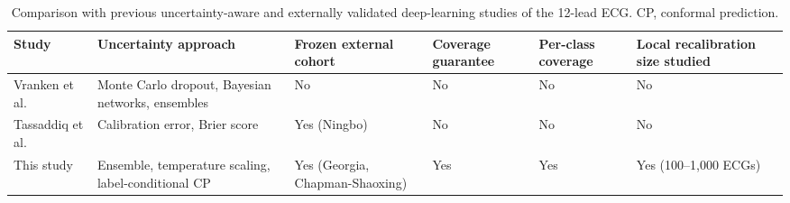 \begin{table}[!t]
\centering\footnotesize
\caption{Comparison with previous uncertainty-aware and externally validated deep-learning studies of the 12-lead ECG. CP, conformal prediction.}
\label{tab:related}
\setlength{\tabcolsep}{3pt}
\begin{tabular}{L{2.3cm}L{3.1cm}L{2.2cm}L{1.5cm}L{1.4cm}L{1.9cm}}
\toprule
Study & Uncertainty approach & Frozen external cohort & Coverage guarantee & Per-class coverage & Local recalibration size studied \\
\midrule
Vranken et al. \cite{vranken2021} & Monte Carlo dropout, Bayesian networks, ensembles & No & No & No & No \\
Tassaddiq et al. \cite{tassaddiq2026} & Calibration error, Brier score & Yes (Ningbo) & No & No & No \\
This study & Ensemble, temperature scaling, label-conditional CP & Yes (Georgia, Chapman-Shaoxing) & Yes & Yes & Yes (100--1,000 ECGs) \\
\bottomrule
\end{tabular}
\end{table}


